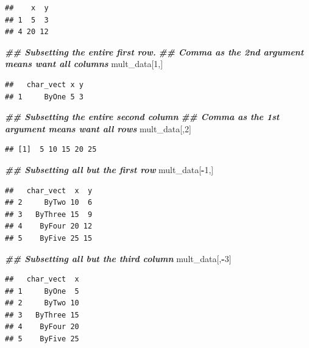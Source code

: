 \documentclass[
]{book}
\newenvironment{Shaded}{\begin{snugshade}}{\end{snugshade}}
\newcommand{\DecValTok}[1]{\textcolor[rgb]{0.00,0.00,0.81}{#1}}
\newcommand{\DocumentationTok}[1]{\textcolor[rgb]{0.56,0.35,0.01}{\textbf{\textit{#1}}}}
\newcommand{\NormalTok}[1]{#1}
\newcommand{\SpecialCharTok}[1]{\textcolor[rgb]{0.81,0.36,0.00}{\textbf{#1}}}
\theoremstyle{definition}
\theoremstyle{definition}
\theoremstyle{definition}
\theoremstyle{definition}
\theoremstyle{remark}
\begin{document}
\begin{verbatim}
##    x  y
## 1  5  3
## 4 20 12
\end{verbatim}

\begin{Shaded}
\begin{Highlighting}[]
\DocumentationTok{\#\# Subsetting the entire first row.}
\DocumentationTok{\#\# Comma as the 2nd argument means want all columns}
\NormalTok{mult\_data[}\DecValTok{1}\NormalTok{,]}
\end{Highlighting}
\end{Shaded}

\begin{verbatim}
##   char_vect x y
## 1     ByOne 5 3
\end{verbatim}

\begin{Shaded}
\begin{Highlighting}[]
\DocumentationTok{\#\# Subsetting the entire second column}
\DocumentationTok{\#\# Comma as the 1st argument means want all rows}
\NormalTok{mult\_data[,}\DecValTok{2}\NormalTok{]}
\end{Highlighting}
\end{Shaded}

\begin{verbatim}
## [1]  5 10 15 20 25
\end{verbatim}

\begin{Shaded}
\begin{Highlighting}[]
\DocumentationTok{\#\# Subsetting all but the first row}
\NormalTok{mult\_data[}\SpecialCharTok{{-}}\DecValTok{1}\NormalTok{,]}
\end{Highlighting}
\end{Shaded}

\begin{verbatim}
##   char_vect  x  y
## 2     ByTwo 10  6
## 3   ByThree 15  9
## 4    ByFour 20 12
## 5    ByFive 25 15
\end{verbatim}

\begin{Shaded}
\begin{Highlighting}[]
\DocumentationTok{\#\# Subsetting all but the third column}
\NormalTok{mult\_data[,}\SpecialCharTok{{-}}\DecValTok{3}\NormalTok{]}
\end{Highlighting}
\end{Shaded}

\begin{verbatim}
##   char_vect  x
## 1     ByOne  5
## 2     ByTwo 10
## 3   ByThree 15
## 4    ByFour 20
## 5    ByFive 25
\end{verbatim}
\end{document}
